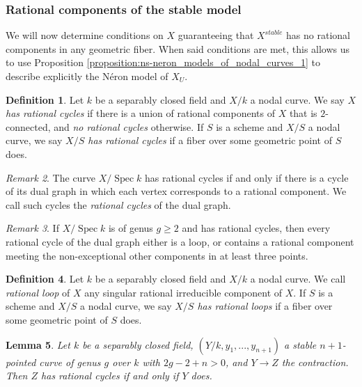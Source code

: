 \documentclass[a4paper,12pt]{amsart} %
\numberwithin{equation}{subsection}
\newcommand{\Spec}{\operatorname{Spec}}
\theoremstyle{definition}
\newtheorem{definition}{Definition}[section]
\theoremstyle{plain}%
\newtheorem{lemma}[definition]{Lemma}
\theoremstyle{remark}
\newtheorem{remark}[definition]{Remark}
\begin{document}
\subsubsection{Rational components of the stable model}

We will now determine conditions on $X$ guaranteeing that $X^{stable}$ has no rational components in any geometric fiber. When said conditions are met, this allows us to use Proposition \ref{proposition:ns-neron_models_of_nodal_curves_1} to describe explicitly the N\'eron model of $X_U$.

\begin{definition}\label{definition rational cycles}
Let $k$ be a separably closed field and $X/k$ a nodal curve. We say \emph{$X$ has rational cycles} if there is a union of rational components of $X$ that is $2$-connected, and \emph{no rational cycles} otherwise. If $S$ is a scheme and $X/S$ a nodal curve, we say \emph{$X/S$ has rational cycles} if a fiber over some geometric point of $S$ does.
\end{definition}

\begin{remark}
The curve $X/\Spec k$ has rational cycles if and only if there is a cycle of its dual graph in which each vertex corresponds to a rational component. We call such cycles the \emph{rational cycles} of the dual graph.
\end{remark}

\begin{remark}\label{remark rational cycles implies rational loops or 3-point rational components}
If $X/\Spec k$ is of genus $g\geq 2$ and has rational cycles, then every rational cycle of the dual graph either is a loop, or contains a rational component meeting the non-exceptional other components in at least three points.
\end{remark}

\begin{definition}\label{definition rational loops}
Let $k$ be a separably closed field and $X/k$ a nodal curve. We call \emph{rational loop} of $X$ any singular rational irreducible component of $X$. If $S$ is a scheme and $X/S$ a nodal curve, we say \emph{$X/S$ has rational loops} if a fiber over some geometric point of $S$ does.
\end{definition}

\begin{lemma}
Let $k$ be a separably closed field, $(Y/k,y_1,...,y_{n+1})$ a stable $n+1$-pointed curve of genus $g$ over $k$ with $2g-2+n>0$, and $Y\to Z$ the contraction. Then $Z$ has rational cycles if and only if $Y$ does.
\end{lemma}
\end{document}
